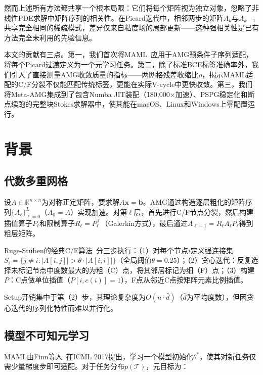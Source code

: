 \documentclass[11pt,a4paper]{ctexart}
\begin{document}
然而上述所有方法都共享一个根本局限：它们将每个矩阵视为独立对象，忽略了非线性PDE求解中矩阵序列的相关性。在Picard迭代中，相邻两步的矩阵$A_k$与$A_{k-1}$共享完全相同的稀疏模式，差异仅来自粘度场的局部更新——这种强相关性是已有方法完全未利用的先验信息。

本文的贡献有三点。第一，我们首次将MAML~\cite{finn2017}应用于AMG预条件子序列适配，将每个Picard过渡定义为一个元学习任务。第二，除了标准BCE标签准确率外，我们引入了直接测量AMG收敛质量的指标——两网格残差收缩比$\rho$，揭示MAML适配的C/F分裂不仅能匹配传统标签，更能在实际V-cycle中更快收敛。第三，我们将Meta-AMG集成到了包含Numba JIT装配（180,000$\times$加速）、PSPG稳定化和断点续跑的完整块Stokes求解器中，使其能在macOS、Linux和Windows上零配置运行。

\section{背景}
\label{sec:background}

\subsection{代数多重网格}

设$A \in \mathbb{R}^{n \times n}$为对称正定矩阵，要求解$A\mathbf{x} = \mathbf{b}$。AMG通过构造逐层粗化的矩阵序列$\{A_\ell\}_{\ell=0}^L$（$A_0 = A$）实现加速。对第$\ell$层，首先进行C/F节点分裂，然后构建插值算子$P_\ell$和限制算子$R_\ell = P_\ell^\top$（Galerkin方式），最后通过$A_{\ell+1} = R_\ell A_\ell P_\ell$得到粗层矩阵。

Ruge-St\"{u}ben的经典C/F算法~\cite{ruge1987}分三步执行：（1）对每个节点$i$定义强连接集$S_i = \{j \neq i : |A[i,j]| > \theta \cdot |A[i,i]|\}$（全局阈值$\theta = 0.25$）；（2）贪心迭代：反复选择未标记节点中度数最大的为粗（C）点，将其邻居标记为细（F）点；（3）构建$P$：C点做单位插值（$P[i, c(i)] = 1$），F点从邻近C点按矩阵元素比例插值。

Setup开销集中于第（2）步，其理论复杂度为$O(n \cdot \bar{d})$（$\bar{d}$为平均度数），但因贪心迭代的序列化特性而难以并行化。

\subsection{模型不可知元学习}

MAML由Finn等人~\cite{finn2017}在ICML 2017提出，学习一个模型初始化$\theta^*$，使其对新任务仅需少量梯度步即可适配。对于任务分布$p(\mathcal{T})$，元目标为：
\end{document}
